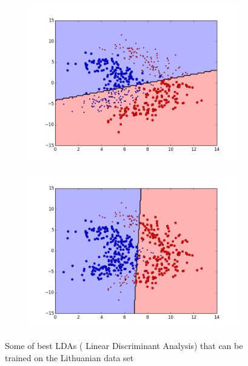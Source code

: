 \begin{figure}[t!]
\medskip
\begin{subfigure}{0.48\textwidth}
\includegraphics[width=\linewidth]{figs/Lithuanian/118All-Classifiers}
\caption{} \label{fig:Lithuanian_all_single_e}
\end{subfigure}\hspace*{\fill}
\begin{subfigure}{0.48\textwidth}
\includegraphics[width=\linewidth]{figs/Lithuanian/146All-Classifiers}
\caption{} \label{fig:Lithuanian_all_single_f}
\end{subfigure}

\caption{Some of best LDAs ( Linear Discriminant Analysis) that can be trained on the Lithuanian data set} \label{fig:Lithuanian_all_single}
\end{figure}

